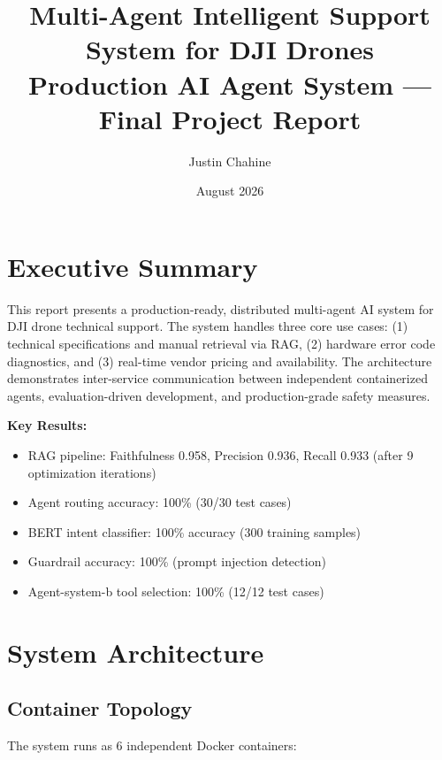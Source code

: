 \documentclass[12pt,a4paper]{article}
\title{\textbf{Multi-Agent Intelligent Support System for DJI Drones}\\[0.5em]
\large Production AI Agent System — Final Project Report}
\author{Justin Chahine}
\date{August 2026}
\begin{document}
\maketitle
\tableofcontents
\newpage

\section{Executive Summary}

This report presents a production-ready, distributed multi-agent AI system for DJI drone technical support. The system handles three core use cases: (1) technical specifications and manual retrieval via RAG, (2) hardware error code diagnostics, and (3) real-time vendor pricing and availability. The architecture demonstrates inter-service communication between independent containerized agents, evaluation-driven development, and production-grade safety measures.

\textbf{Key Results:}
\begin{itemize}
  \item RAG pipeline: Faithfulness 0.958, Precision 0.936, Recall 0.933 (after 9 optimization iterations)
  \item Agent routing accuracy: 100\% (30/30 test cases)
  \item BERT intent classifier: 100\% accuracy (300 training samples)
  \item Guardrail accuracy: 100\% (prompt injection detection)
  \item Agent-system-b tool selection: 100\% (12/12 test cases)
\end{itemize}

\section{System Architecture}

\subsection{Container Topology}

The system runs as 6 independent Docker containers:
\end{document}
